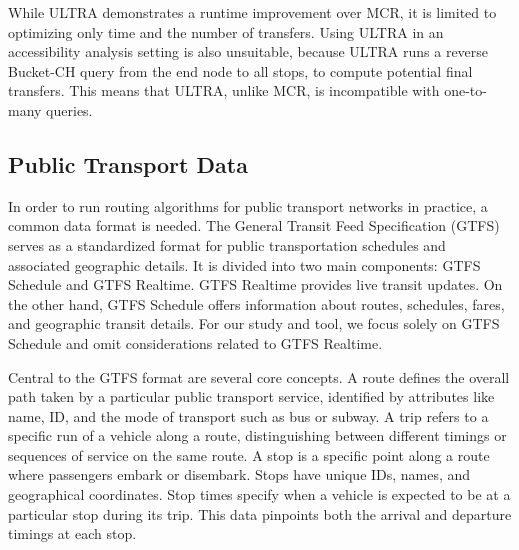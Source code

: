While ULTRA demonstrates a runtime improvement over MCR, it is limited to optimizing only time and the number of transfers.
Using ULTRA in an accessibility analysis setting is also unsuitable, because ULTRA runs a reverse Bucket-CH query from the end node to all stops, to compute potential final transfers.
This means that ULTRA, unlike MCR, is incompatible with one-to-many queries.







\subsection{Public Transport Data}
\label{subsec:public_transport_data}

In order to run routing algorithms for public transport networks in practice, a common data format is needed.
The General Transit Feed Specification (GTFS)  serves as a standardized format for public transportation schedules and associated geographic details.
It is divided into two main components: GTFS Schedule and GTFS Realtime.
GTFS Realtime provides live transit updates.
On the other hand, GTFS Schedule offers information about routes, schedules, fares, and geographic transit details.
For our study and tool, we focus solely on GTFS Schedule and omit considerations related to GTFS Realtime.

Central to the GTFS format are several core concepts.
A route defines the overall path taken by a particular public transport service, identified by attributes like name, ID, and the mode of transport such as bus or subway.
A trip refers to a specific run of a vehicle along a route, distinguishing between different timings or sequences of service on the same route.
A stop is a specific point along a route where passengers embark or disembark.
Stops have unique IDs, names, and geographical coordinates.
Stop times specify when a vehicle is expected to be at a particular stop during its trip.
This data pinpoints both the arrival and departure timings at each stop.

